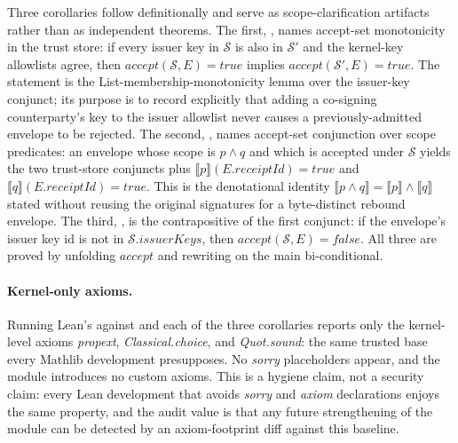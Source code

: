 Three corollaries follow definitionally and serve as scope-clarification artifacts rather than as independent theorems. The first, , names accept-set monotonicity in the trust store: if every issuer key in $\mathcal{S}$ is also in $\mathcal{S}'$ and the kernel-key allowlists agree, then $\mathit{accept}(\mathcal{S},E) = \mathit{true}$ implies $\mathit{accept}(\mathcal{S}',E) = \mathit{true}$. The statement is the List-membership-monotonicity lemma over the issuer-key conjunct; its purpose is to record explicitly that adding a co-signing counterparty's key to the issuer allowlist never causes a previously-admitted envelope to be rejected. The second, , names accept-set conjunction over scope predicates: an envelope whose scope is $p \wedge q$ and which is accepted under $\mathcal{S}$ yields the two trust-store conjuncts plus $\llbracket p\rrbracket(E.\mathit{receiptId}) = \mathit{true}$ and $\llbracket q\rrbracket(E.\mathit{receiptId}) = \mathit{true}$. This is the denotational identity $\llbracket p \wedge q\rrbracket = \llbracket p\rrbracket \wedge \llbracket q\rrbracket$ stated without reusing the original signatures for a byte-distinct rebound envelope. The third, , is the contrapositive of the first conjunct: if the envelope's issuer key id is not in $\mathcal{S}.\mathit{issuerKeys}$, then $\mathit{accept}(\mathcal{S},E) = \mathit{false}$. All three are proved by unfolding $\mathit{accept}$ and rewriting on the main bi-conditional.

\paragraph{Kernel-only axioms.} Running Lean's  against  and each of the three corollaries reports only the kernel-level axioms \emph{propext}, \emph{Classical.choice}, and \emph{Quot.sound}: the same trusted base every Mathlib development presupposes. No \emph{sorry} placeholders appear, and the module introduces no custom axioms. This is a hygiene claim, not a security claim: every Lean development that avoids \emph{sorry} and \emph{axiom} declarations enjoys the same property, and the audit value is that any future strengthening of the module can be detected by an axiom-footprint diff against this baseline.

